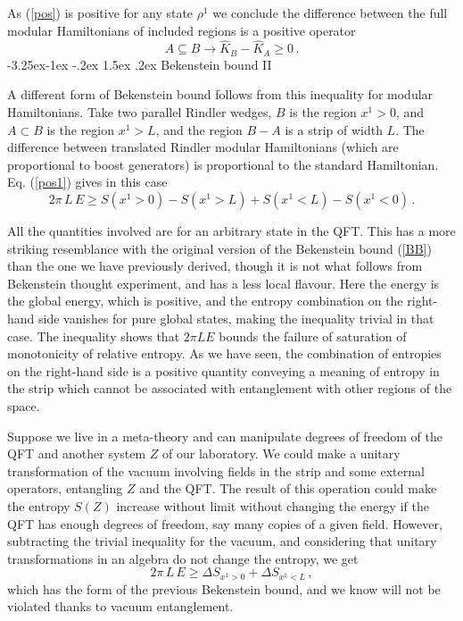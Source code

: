 \documentclass[11pt]{article}
\makeatletter
\renewcommand\subsection{\@startsection{subsection}{2}{\z@}%
                                   {-3.25ex\@plus -1ex \@minus -.2ex}%
                                     {1.5ex \@plus .2ex}%
                                     {\normalfont\bfseries}}
\numberwithin{equation}{section}
\newcommand{\be}{\begin{equation}}
\newcommand{\ee}{\end{equation}}
\makeatother
\begin{document}
As (\ref{pos}) is positive for any state $\rho^1$ we conclude the difference between the full modular Hamiltonians of included regions is a positive operator
\be
A\subseteq B\rightarrow \hat{K}_B-\hat{K}_A\ge 0\,.\label{mono}
\ee
\subsection{Bekenstein bound II }

A different form of Bekenstein bound follows from this inequality for modular Hamiltonians. Take two parallel Rindler wedges, $B$ is the region $x^1>0$, and $A\subset B$ is the region $x^1>L$, and the region $B-A$ is a strip of width $L$. The difference between translated Rindler modular Hamiltonians (which are proportional to boost generators) is proportional to the standard Hamiltonian. Eq. (\ref{pos1}) gives in this case
\be
2 \pi \,L \,E\ge S(x^1>0)-S(x^1>L)+S(x^1<L)-S(x^1 <0)\,.    
\ee

All the quantities involved are for an arbitrary state in the QFT. This has a more striking resemblance with the original version of the Bekenstein bound (\ref{BB}) than the one we have previously derived, though it is not what follows from Bekenstein thought experiment, and has a less local flavour. Here the energy is the global energy, which is positive, and the entropy combination on the right-hand side vanishes for pure global states, making the inequality trivial in that case. The inequality shows that $2\pi L E $ bounds the failure of saturation of monotonicity of relative entropy. As we have seen, the combination of entropies on the right-hand side is a positive quantity conveying a meaning of entropy in the strip which cannot be associated with entanglement with other regions of the space. 

Suppose we live in a meta-theory and can manipulate degrees of freedom of the QFT and another system $Z$ of our laboratory. We could make a unitary transformation of the vacuum involving fields in the strip and some external operators, entangling $Z$ and the QFT. The result of this operation could make the entropy $S(Z)$ increase without limit without changing the energy if the QFT has enough degrees of freedom, say many copies of a given field. However, subtracting the trivial inequality for the vacuum, and considering that unitary transformations in an algebra do not change the entropy, we get 
\be
2\pi\,L\,  E\ge \Delta S_{x^1>0}+\Delta S_{x^1<L}\,,    
\ee
which has the form of the previous Bekenstein bound, and we know will not be violated thanks to vacuum entanglement.  
\end{document}
